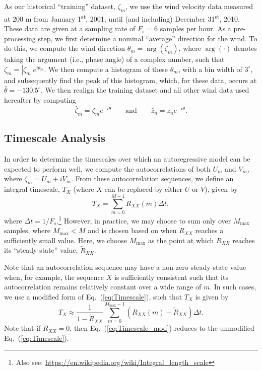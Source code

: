 \documentclass[11pt, oneside]{article}
\newcommand{\eqnref}[1]{Eq.~(\ref{#1})}
\begin{document}
As our historical ``training'' dataset, $\zeta_m$, we use the wind velocity data measured at 200 m from January 1\textsuperscript{st}, 2001, until (and including) December 31\textsuperscript{st}, 2010.
These data are given at a sampling rate of $F_s = 6$ samples per hour.
As a pre-processing step, we first determine a nominal ``average'' direction for the wind.
To do this, we compute the wind direction $\theta_m = \arg (\zeta_m)$, where $\arg ( \cdot )$ denotes taking the argument (i.e., phase angle) of a complex number, such that $\zeta_m = |\zeta_m| e^{i \theta_m}$.
We then compute a histogram of these $\theta_m$, with a bin width of $3^\circ$, and subsequently find the peak of this histogram, which, for these data, occurs at $\hat{\theta} = -130.5^\circ$. %
We then realign the training dataset and all other wind data used hereafter by computing
\begin{equation}
\hat{\zeta}_m = \zeta_m e^{-i\hat{\theta}}
\quad\quad \text{and} \quad\quad
\hat{z}_n = z_n e^{-i\hat{\theta}}.
\end{equation}

\subsection{Timescale Analysis}\label{sec:Methodology:Timescale}
In order to determine the timescales over which an autoregressive model can be expected to perform well, we compute the autocorrelations of both $U_m$ and $V_m$, where $\zeta_m = U_m + i V_m$.
From these autocorrelation sequences, we define an integral timescale, $T_X$ (where $X$ can be replaced by either $U$ or $V$), given by \citep{ONeill2004}
\begin{equation}\label{eq:Timescale}
T_X = \sum_{m = 0}^{M-1} R_{XX}(m) \Delta t,
\end{equation}
where $\Delta t = 1/F_s$.\footnote{Also see: \url{https://en.wikipedia.org/wiki/Integral_length_scale}}
However, in practice, we may choose to sum only over $M_\text{max}$ samples, where $M_\text{max} < M$ and is chosen based on when $R_{XX}$ reaches a sufficiently small value.
Here, we choose $M_\text{max}$ as the point at which $R_{XX}$ reaches its ``steady-state'' value, $\tilde{R}_{XX}$.

Note that an autocorrelation sequence may have a non-zero steady-state value when, for example, the sequence $X$ is sufficiently consistent such that its autocorrelation remains relatively constant over a wide range of $m$.
In such cases, we use a modified form of \eqnref{eq:Timescale}, such that $T_X$ is given by
\begin{equation}\label{eq:Timescale_mod}
T_X \approx \frac{1}{1 - \tilde{R}_{XX}} \sum_{m = 0}^{M_\text{max}-1} (R_{XX}(m) - \tilde{R}_{XX}) \Delta t.
\end{equation}
Note that if $\tilde{R}_{XX} = 0$, then \eqnref{eq:Timescale_mod} reduces to the unmodified \eqnref{eq:Timescale}.
\end{document}
